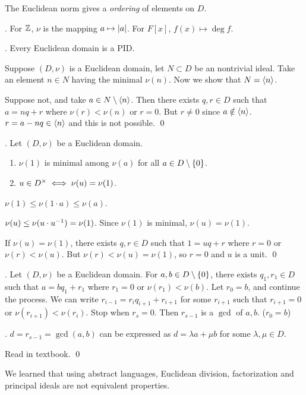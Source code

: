 The Euclidean norm gives a \textit{ordering} of elements on \(D\).

\ex. For \(\mathbb{Z}\), \(\nu\) is the mapping \(a \mapsto \left| a \right|\). For \(F[x]\), \(f(x) \mapsto \deg f\).

\thm. Every Euclidean domain is a PID.

\pf Suppose \((D, \nu)\) is a Euclidean domain, let \(N \subset D\) be an nontrivial ideal. Take an element \(n \in N\) having the minimal \(\nu(n)\). Now we show that \(N = \left\langle n \right\rangle\).

Suppose not, and take \(a \in N \setminus \left\langle n \right\rangle\). Then there exists \(q, r \in D\) such that \(a = nq + r\) where \(\nu(r) < \nu(n)\) or \(r = 0\). But \(r \neq 0\) since \(a \notin \left\langle n \right\rangle\). \(r = a - nq \in \left\langle n \right\rangle\) and this is not possible. \qed

\thm. Let \((D, \nu)\) be a Euclidean domain.
\begin{enumerate}
    \item \(\nu(1)\) is minimal among \(\nu(a)\) for all \(a \in D \setminus \{0\}\).
    \item \(u \in D^\times \iff \nu(u) = \nu(1)\).
\end{enumerate}

\pf {} \(\nu(1) \leq \nu(1 \cdot a) \leq \nu(a)\).

 \note{\mimp} \(\nu(u) \leq \nu(u \cdot u ^{-1}) = \nu(1)\). Since \(\nu(1)\) is minimal, \(\nu(u) = \nu(1)\).

\note{\mimpd} If \(\nu(u) = \nu(1)\), there exists \(q, r \in D\) such that \(1 = uq + r\) where \(r = 0\) or \(\nu(r) < \nu(u)\). But \(\nu(r) < \nu(u) = \nu(1)\), so \(r = 0\) and \(u\) is a unit. \qed

\thm. Let \((D, \nu)\) be a Euclidean domain. For \(a, b \in D \setminus \{0\}\), there exists \(q_1, r_1 \in D\) such that \(a = bq_1 + r_1\) where \(r_1 = 0\) or \(\nu(r_1) < \nu(b)\). Let \(r_0 = b\), and continue the process. We can write \(r_{i-1} = r_i q_{i+1} + r_{i+1}\) for some \(r_{i+1}\) such that \(r_{i+1} = 0\) or \(\nu(r_{i+1}) < \nu(r_{i})\). Stop when \(r_s = 0\). Then \(r_{s-1}\) is a \(\gcd\) of \(a, b\). (\(r_0 = b\))

\cor. \(d = r_{s-1} = \gcd(a, b)\) can be expressed as \(d = \lambda a + \mu b\) for some \(\lambda, \mu \in D\).

\pf Read in textbook. \qed

We learned that using abstract languages, Euclidean division, factorization and principal ideals are not equivalent properties.

